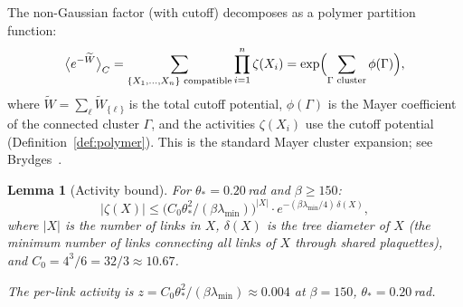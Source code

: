 \documentclass[11pt]{article}
\newtheorem{lemma}[theorem]{Lemma}
\theoremstyle{definition}
\begin{document}
The non-Gaussian factor (with cutoff) decomposes as a polymer
partition function:
\begin{equation}\label{eq:polymer-Z}
\bigl\langle e^{-\widetilde{W}}\bigr\rangle_C
=\sum_{\{X_1,\ldots,X_n\}\text{ compatible}}
\prod_{i=1}^n\zeta(X_i)
=\exp\Bigl(\sum_{\Gamma\text{ cluster}}\phi(\Gamma)\Bigr),
\end{equation}
where $\widetilde{W}=\sum_\ell\widetilde{W}_{\{\ell\}}$ is the total
cutoff potential, $\phi(\Gamma)$ is the Mayer coefficient of the
connected cluster $\Gamma$, and the activities $\zeta(X_i)$ use
the cutoff potential (Definition~\ref{def:polymer}).  This is the
standard Mayer cluster expansion; see Brydges~\cite{Brydges86}.

\begin{lemma}[Activity bound]\label{lem:activity}
For $\theta_*=0.20$\,rad and $\beta\ge 150$:
\begin{equation}
|\zeta(X)|\le\bigl(C_0\theta_*^2/(\beta\lambda_{\min})\bigr)^{|X|}
\cdot e^{-(\beta\lambda_{\min}/4)\,\delta(X)},
\end{equation}
where $|X|$ is the number of links in $X$, $\delta(X)$ is the
tree diameter of $X$ (the minimum number of links connecting all
links of $X$ through shared plaquettes), and
$C_0=4^3/6=32/3\approx 10.67$.

The per-link activity is $z=C_0\theta_*^2/(\beta\lambda_{\min})
\approx 0.004$ at $\beta=150$, $\theta_*=0.20$\,rad.
\end{lemma}
\end{document}
